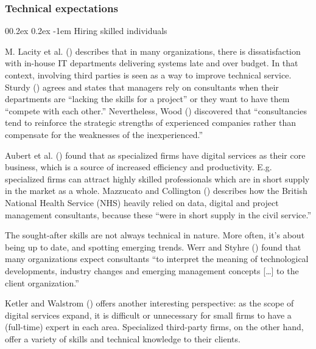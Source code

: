 \documentclass[
  man,floatsintext]{apa6}
\makeatletter
\let\oldparagraph\paragraph
\renewcommand{\paragraph}[1]{\oldparagraph{#1}\mbox{}}
\renewcommand{\paragraph}{\@startsection{paragraph}{4}{\parindent}%
  {0\baselineskip \@plus 0.2ex \@minus 0.2ex}%
  {-1em}%
  {\normalfont\normalsize\bfseries\itshape\typesectitle}}
\makeatother
\begin{document}
\subsubsection{Technical expectations}\label{technical-expectations}

\paragraph{Hiring skilled individuals}\label{hiring-skilled-individuals}

M. Lacity et al. () describes that in many organizations, there is dissatisfaction with in-house IT departments delivering systems late and over budget. In that context, involving third parties is seen as a way to improve technical service. Sturdy () agrees and states that managers rely on consultants when their departments are ``lacking the skills for a project'' or they want to have them ``compete with each other.'' Nevertheless, Wood () discovered that ``consultancies tend to reinforce the strategic strengths of experienced companies rather than compensate for the weaknesses of the inexperienced.''

Aubert et al. () found that as specialized firms have digital services as their core business, which is a source of increased efficiency and productivity. E.g. specialized firms can attract highly skilled professionals which are in short supply in the market as a whole. Mazzucato and Collington () describes how the British National Health Service (NHS) heavily relied on data, digital and project management consultants, because these ``were in short supply in the civil service.''

The sought-after skills are not always technical in nature. More often, it's about being up to date, and spotting emerging trends. Werr and Styhre () found that many organizations expect consultants ``to interpret the meaning of technological developments, industry changes and emerging management concepts {[}\ldots{]} to the client organization.''

Ketler and Walstrom () offers another interesting perspective: as the scope of digital services expand, it is difficult or unnecessary for small firms to have a (full-time) expert in each area. Specialized third-party firms, on the other hand, offer a variety of skills and technical knowledge to their clients.
\end{document}
